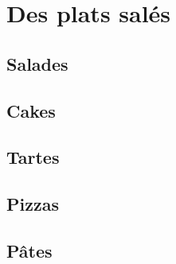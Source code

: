 \documentclass[A4paper,twoside, 12pt]{book}
\begin{document}
\frontmatter
\tableofcontents 		%

\mainmatter


\part{Des plats salés}
	\chapter{Salades}










	\chapter{Cakes}




	
	
	\chapter{Tartes}


	



	\chapter{Pizzas}
	\chapter{Pâtes}
	
\end{document}
